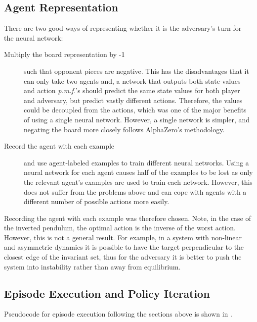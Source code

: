 \documentclass[../main.tex]{subfiles}
\begin{document}
\subsection{Agent Representation}

There are two good ways of representing whether it is the adversary's turn for the neural network: 
\begin{description}
   \item[Multiply the board representation by -1] such that opponent pieces are negative. This has the disadvantages that it can only take two agents and, a network that outputs both state-values and action \textit{p.m.f.}'s should predict the same state values for both player and adversary, but predict vastly different actions. Therefore, the values could be decoupled from the actions, which was one of the major benefits of using a single neural network. However, a single network is simpler, and negating the board more closely follows AlphaZero's methodology.

   \item[Record the agent with each example] and use agent-labeled examples to train different neural networks. Using a neural network for each agent causes half of the examples to be lost as only the relevant agent's examples are used to train each network. However, this does not suffer from the problems above and can cope with agents with a different number of possible actions more easily.
\end{description}

Recording the agent with each example was therefore chosen. Note, in the case of the inverted pendulum, the optimal action is the inverse of the worst action. However, this is not a general result. For example, in a system with non-linear and asymmetric dynamics it is possible to have the target perpendicular to the closest edge of the invariant set, thus for the adversary it is better to push the system into instability rather than away from equilibrium.

\subsection{Episode Execution and Policy Iteration}

Pseudocode for episode execution following the sections above is shown in .
\end{document}
